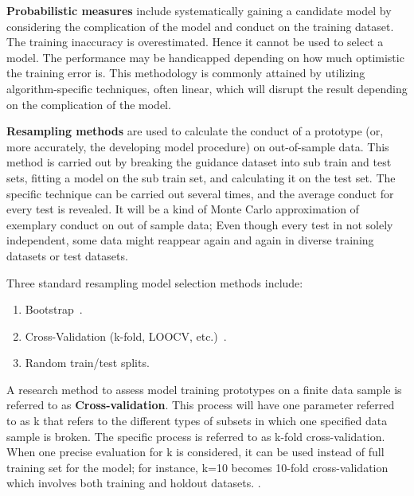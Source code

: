 \documentclass[a4paper,singleside,12pt]{report} %
\begin{document}
				
				\textbf{Probabilistic measures} include systematically gaining a candidate model by considering the complication of the model and conduct on the training dataset. 
				The training inaccuracy is overestimated. 
				Hence it cannot be used to select a model. 
				The performance may be handicapped depending on how much optimistic the training error is. 
				This methodology is commonly attained by utilizing algorithm-specific techniques, often linear, which will disrupt the result depending on the complication of the model.
				
				\textbf{Resampling methods} are used to calculate the conduct of a prototype (or, more accurately, the developing model procedure) on out-of-sample data. 
				This method is carried out by breaking the guidance dataset into sub train and test sets, fitting a model on the sub train set, and calculating it on the test set. 
				The specific technique can be carried out several times, and the average conduct for every test is revealed. 
				It will be a kind of Monte Carlo approximation of exemplary conduct on out of sample data; Even though every test in not solely independent, some data might reappear again and again in diverse training datasets or test datasets.
				
				Three standard resampling model selection methods include:
				
				\begin{enumerate}
				  \item Bootstrap~\cite{kohavi1995study}.
				  \item Cross-Validation (k-fold, LOOCV, etc.)~\cite{browne2000cross}.
				  \item Random train/test splits.
				\end{enumerate}
				
				
				A research method to assess model training prototypes on a finite data sample is referred to as \textbf{Cross-validation}. 
				This process will have one parameter referred to as k that refers to the different types of subsets in which one specified data sample is broken. 
				The specific process is referred to as k-fold cross-validation. 
				When one precise evaluation for k is considered, it can be used instead of full training set for the model; for instance, k=10 becomes 10-fold cross-validation which involves both training and holdout datasets. .
\end{document}
